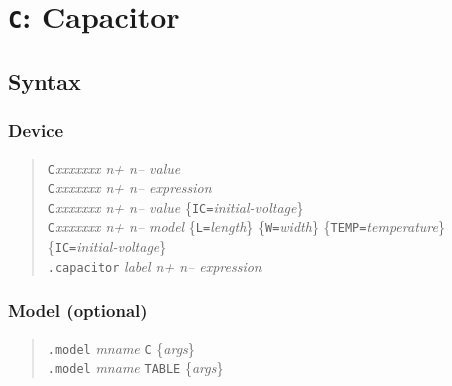 %
%
%
%
\section{{\tt C}: Capacitor}
\subsection{Syntax}
\subsubsection{Device}
\begin{verse}
{\tt C}{\it xxxxxxx n+ n-- value}\\
{\tt C}{\it xxxxxxx n+ n-- expression}\\
{\tt C}{\it xxxxxxx n+ n-- value}
	\{{\tt IC=}{\it initial-voltage}\}\\
{\tt C}{\it xxxxxxx n+ n-- model} \{{\tt L=}{\it length}\}
	\{{\tt W=}{\it width}\} \{{\tt TEMP=}{\it temperature}\}
	\{{\tt IC=}{\it initial-voltage}\}\\
{\tt .capacitor} {\it label n+ n-- expression}
\end{verse}
\subsubsection{Model (optional)}
\begin{verse}
{\tt .model} {\it mname} {\tt C} \{{\it args}\} \\
{\tt .model} {\it mname} {\tt TABLE} \{{\it args}\}
\end{verse}
